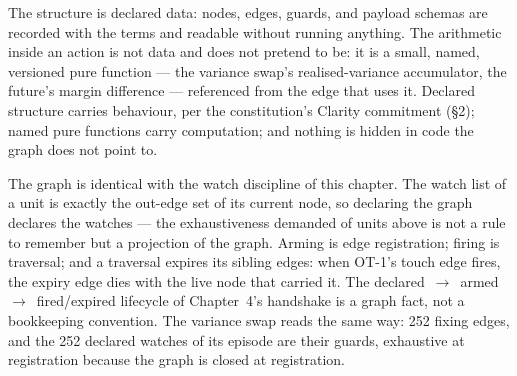The structure is declared data: nodes, edges, guards, and payload schemas are recorded
with the terms and readable without running anything. The arithmetic inside an action is
not data and does not pretend to be: it is a small, named, versioned pure function ---
the variance swap's realised-variance accumulator, the future's margin difference ---
referenced from the edge that uses it. Declared structure carries behaviour, per the
constitution's Clarity commitment (\S 2); named pure functions carry computation; and
nothing is hidden in code the graph does not point to.

The graph is identical with the watch discipline of this chapter. The watch list of a
unit is exactly the out-edge set of its current node, so declaring the graph declares
the watches --- the exhaustiveness demanded of units above is not a rule to remember but
a projection of the graph. Arming is edge registration; firing is traversal; and a
traversal expires its sibling edges: when OT-1's touch edge fires, the expiry edge dies
with the live node that carried it. The declared~$\to$~armed~$\to$~fired/expired
lifecycle of Chapter~4's handshake is a graph fact, not a bookkeeping convention. The
variance swap reads the same way: 252 fixing edges, and the 252 declared watches of its
episode are their guards, exhaustive at registration because the graph is closed at
registration.

